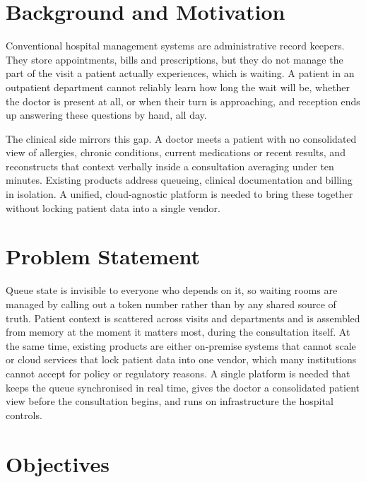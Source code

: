 \documentclass[12pt,a4paper]{article}
\begin{document}
\setcounter{page}{1}

\section{Background and Motivation}

Conventional hospital management systems are administrative record keepers. They store appointments, bills and prescriptions, but they do not manage the part of the visit a patient actually experiences, which is waiting. A patient in an outpatient department cannot reliably learn how long the wait will be, whether the doctor is present at all, or when their turn is approaching, and reception ends up answering these questions by hand, all day.

The clinical side mirrors this gap. A doctor meets a patient with no consolidated view of allergies, chronic conditions, current medications or recent results, and reconstructs that context verbally inside a consultation averaging under ten minutes. Existing products address queueing, clinical documentation and billing in isolation. A unified, cloud-agnostic platform is needed to bring these together without locking patient data into a single vendor.

\section{Problem Statement}

Queue state is invisible to everyone who depends on it, so waiting rooms are managed by calling out a token number rather than by any shared source of truth. Patient context is scattered across visits and departments and is assembled from memory at the moment it matters most, during the consultation itself. At the same time, existing products are either on-premise systems that cannot scale or cloud services that lock patient data into one vendor, which many institutions cannot accept for policy or regulatory reasons. A single platform is needed that keeps the queue synchronised in real time, gives the doctor a consolidated patient view before the consultation begins, and runs on infrastructure the hospital controls.

\section{Objectives}
\end{document}
